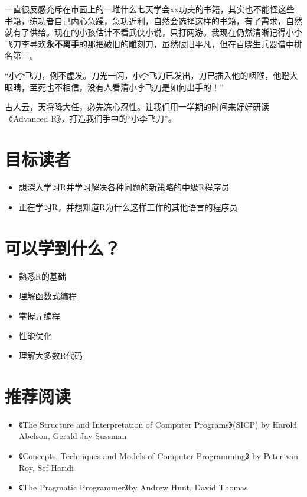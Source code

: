 \documentclass[]{article}
\begin{document}
一直很反感充斥在市面上的一堆什么七天学会xx功夫的书籍，其实也不能怪这些书籍，练功者自己内心急躁，急功近利，自然会选择这样的书籍，有了需求，自然就有了供给。现在的小孩估计不看武侠小说，只打网游。我现在仍然清晰记得小李飞刀李寻欢\textbf{永不离手}的那把破旧的雕刻刀，虽然破旧平凡，但在百晓生兵器谱中排名第三。

``小李飞刀，例不虚发。刀光一闪，小李飞刀已发出，刀已插入他的咽喉，他瞪大眼睛，至死也不相信，没有人看清小李飞刀是如何出手的！''

古人云，天将降大任，必先冻心忍性。让我们用一学期的时间来好好研读《Advanced
R》，打造我们手中的``小李飞刀''。

\section{目标读者}

\begin{itemize}
\item
  想深入学习R并学习解决各种问题的新策略的中级R程序员
\item
  正在学习R，并想知道R为什么这样工作的其他语言的程序员
\end{itemize}

\section{可以学到什么？}

\begin{itemize}
\item
  熟悉R的基础
\item
  理解函数式编程
\item
  掌握元编程
\item
  性能优化
\item
  理解大多数R代码
\end{itemize}

\section{推荐阅读}

\begin{itemize}
\item
  《The Structure and Interpretation of Computer Programs》(SICP) by
  Harold Abelson, Gerald Jay Sussman
\item
  《Concepts, Techniques and Models of Computer Programming》 by Peter
  van Roy, Sef Haridi
\item
  《The Pragmatic Programmer》by Andrew Hunt, David Thomas
\end{itemize}
\end{document}
